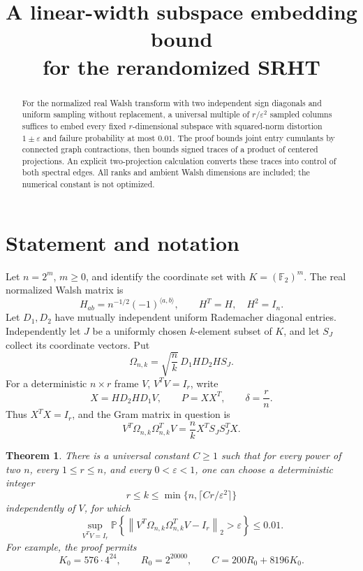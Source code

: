 \documentclass[11pt]{article}
\title{A linear-width subspace embedding bound\\for the rerandomized SRHT}
\author{}
\date{}
\newtheorem{theorem}{Theorem}
\theoremstyle{definition}
\newcommand{\Prob}{\mathbb P}
\newcommand{\F}{\mathbb F}
\newcommand{\norm}[1]{\left\lVert#1\right\rVert_2}
\begin{document}
\maketitle

\begin{abstract}
For the normalized real Walsh transform with two independent sign
diagonals and uniform sampling without replacement, a universal
multiple of \(r/\varepsilon^2\) sampled columns suffices to embed every
fixed \(r\)-dimensional subspace with squared-norm distortion
\(1\pm\varepsilon\) and failure probability at most \(0.01\).
The proof bounds joint entry cumulants by connected graph contractions,
then bounds signed traces of a product of centered projections.
An explicit two-projection calculation converts these traces into
control of both spectral edges. All ranks and ambient Walsh dimensions
are included; the numerical constant is not optimized.
\end{abstract}

\section{Statement and notation}

Let \(n=2^m\), \(m\ge0\), and identify the coordinate set with
\(K=(\F_2)^m\). The real normalized Walsh matrix is
\[
 H_{ab}=n^{-1/2}(-1)^{\langle a,b\rangle},\qquad H^T=H,\quad H^2=I_n.
\]
Let \(D_1,D_2\) have mutually independent uniform Rademacher diagonal
entries. Independently let \(J\) be a uniformly chosen \(k\)-element
subset of \(K\), and let \(S_J\) collect its coordinate vectors. Put
\[
 \Omega_{n,k}=\sqrt{\frac nk}\,D_1HD_2HS_J.
\]
For a deterministic \(n\times r\) frame \(V\), \(V^TV=I_r\), write
\[
 X=HD_2HD_1V,\qquad P=XX^T,\qquad \delta=\frac rn.
\]
Thus \(X^TX=I_r\), and the Gram matrix in question is
\[
 V^T\Omega_{n,k}\Omega_{n,k}^TV
   =\frac nk X^T S_JS_J^T X.                                    \tag{1}
\]

\begin{theorem}\label{thm:main}
There is a universal constant \(C\ge1\) such that for every power of
two \(n\), every \(1\le r\le n\), and every \(0<\varepsilon<1\), one can
choose a deterministic integer
\[
 r\le k\le\min\{n,\lceil Cr/\varepsilon^2\rceil\}
\]
independently of \(V\), for which
\[
 \sup_{V^TV=I_r}
 \Prob\!\left\{\norm{V^T\Omega_{n,k}\Omega_{n,k}^TV-I_r}
                      >\varepsilon\right\}\le0.01.             \tag{2}
\]
For example, the proof permits
\[
 K_0=576\cdot4^{24},\qquad R_0=2^{20000},\qquad
 C=200R_0+8196K_0.                                               \tag{3}
\]
\end{theorem}
\end{document}

